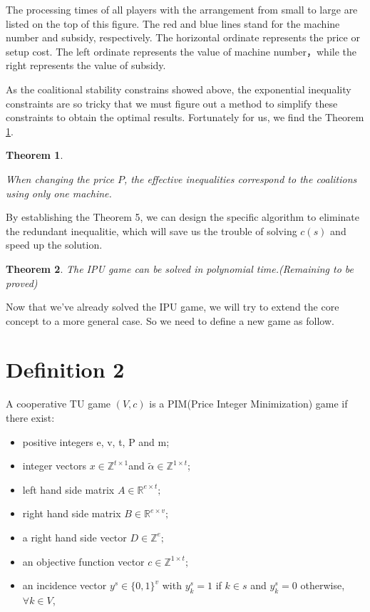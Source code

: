 \documentclass[UTF8]{article}
\newtheorem{thm}{\hspace{2em}Theorem}
\begin{document}
The processing times of all players with the arrangement from small to large are listed on the top of this figure.
The red and blue lines stand for the machine number and subsidy, respectively.
The horizontal ordinate represents the price or setup cost.
The left ordinate represents the value of machine number，while the right represents the value of subsidy.

As the coalitional stability constrains showed above, the exponential inequality constraints are so tricky that we must figure out a method to simplify these constraints to obtain the optimal results. Fortunately for us, we find the Theorem \ref{thm5}.


\begin{thm}\label{thm5}

When changing the price $P$, the effective inequalities correspond to the coalitions using only one machine.
\end{thm}

By establishing the Theorem 5, we can design the specific algorithm to eliminate the redundant inequalitie, which will save us the trouble of solving $c(s)$ and speed up the solution.

\begin{thm}\label{thm6}
The IPU game can be solved in polynomial time.(Remaining to be proved)
\end{thm}

Now that we've already solved the IPU game, we will try to extend the core concept to a more general case. So we need to define a new game as follow.

\section*{Definition 2}

A cooperative TU game $(V,c)$ is a PIM(Price Integer Minimization) game if there exist:

\begin{itemize}
	\item positive integers e, v, t, P and m;
	\item integer vectors $ x \in \mathbb{Z}^{t \times 1} $and $ \tilde{\alpha} \in \mathbb{Z}^{1 \times t} $;
	\item left hand side matrix  $A \in \mathbb{R} ^{e \times t};$
	\item right hand side matrix $B \in \mathbb{R} ^ {e \times v};$
	\item a right hand side vector $D \in \mathbb{Z} ^ {e};$
	\item an objective function vector
	$c \in \mathbb{Z}^{1 \times t};$
	\item an incidence vector $y^s \in \{0,1\}^v$ with $y^s_k = 1$ if $k \in s$ and $y^s_k = 0 $ otherwise, $\forall k \in V$,

\end{itemize}
\end{document}
